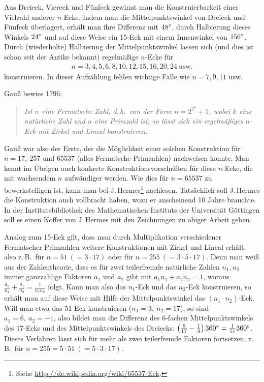 \documentclass[10pt]{article}
\begin{document}
Aus Dreieck, Viereck und Fünfeck gewinnt man die Konstruierbarkeit einer
Vielzahl anderer $n$-Ecke. Indem man die Mittelpunktswinkel von Dreieck und
Fünfeck überlagert, erhält man ihre Differenz mit $48^{\circ}$, durch Halbierung
dieses Winkels $24^{\circ}$ und auf diese Weise ein 15-Eck mit einem Innenwinkel
von $156^{\circ}$. Durch (wiederholte) Halbierung der Mittelpunktswinkel lassen
sich (und dies ist schon seit der Antike bekannt) regelmäßige $n$-Ecke für
\begin{gather*}
  n = 3, 4, 5, 6, 8, 10, 12, 15, 16, 20, 24\ \text{usw.}
\end{gather*}
konstruieren. In dieser Aufzählung fehlen wichtige Fälle wie $n = 7, 9, 11$
usw.

Gauß bewies 1796:
\begin{quote}\em 
  Ist $n$ eine {\glqq}Fermatsche Zahl{\grqq}, d.\,h.\ von der Form
  $n=2^{2^k}+1$, wobei $k$ eine natürliche Zahl und $n$ eine Primzahl ist, so
  lässt sich ein regelmäßiges $n$-Eck mit Zirkel und Lineal konstruieren.
\end{quote}
Gauß war also der Erste, der die Möglichkeit einer solchen Konstruktion für $n
= 17,\ 257$ und 65537 (alles Fermatsche Primzahlen) nachweisen konnte. Man
kennt im Übrigen auch konkrete Konstruktionsvorschriften für diese $n$-Ecke,
die mit wachsendem $n$ aufwändiger werden. Wie dies für $n = 65537$ zu
bewerkstelligen ist, kann man bei J.\,Hermes\footnote{Siehe
  \url{http://de.wikipedia.org/wiki/65537-Eck}.} nachlesen.  Tatsächlich soll
J.\,Hermes die Konstruktion auch vollbracht haben, wozu er anscheinend 10
Jahre brauchte. In der Institutsbibliothek des Mathematischen Instituts der
Universität Göttingen soll es einen Koffer von J.\,Hermes mit den Zeichnungen
zu obiger Arbeit geben.

Analog zum 15-Eck gilt, dass man durch Multiplikation verschiedener
Fermatscher Primzahlen weitere Konstruktionen mit Zirkel und Lineal erhält,
also z.\,B.\ für  $n = 51\ (= 3\cdot 17)$  oder für  $n = 255\
(= 3\cdot 5\cdot 17)$. Denn man weiß aus der Zahlentheorie, dass es für zwei
teilerfremde natürliche Zahlen $n_1, n_2$  immer ganzzahlige Faktoren  $a_1$ 
und  $a_2$  gibt mit  $a_1 n_1  + a_2 n_2  = 1$, woraus $\frac{a_2}{n_1}  +
\frac{a_1}{n_2}  = \frac{1}{n_1 n_2}$ folgt. Kann man also das  $n_1$-Eck und
das  $n_2$-Eck konstruieren, so erhält man auf diese Weise mit Hilfe der
Mittelpunktswinkel das $(n_1\cdot n_2)$-Eck. Will man etwa das 51-Eck
konstruieren ($n_1 = 3,\ n_2 = 17$), so sind  $a_1 = 6,\ a_2 = -1$, also
bildet man die Differenz des 6-fachen Mittelpunktswinkels des 17-Ecks und des
Mittelpunktswinkels des Dreiecks: $\left(\frac{6}{17}-\frac{1}{3}\right)360^{\circ} =
\frac{1}{51} 360^{\circ}$. Dieses Verfahren lässt sich für mehr als zwei
teilerfremde Faktoren fortsetzen, z.\,B.\ für  $n = 255 = 5\cdot 51\
( = 5\cdot 3\cdot 17)$.
\end{document}
